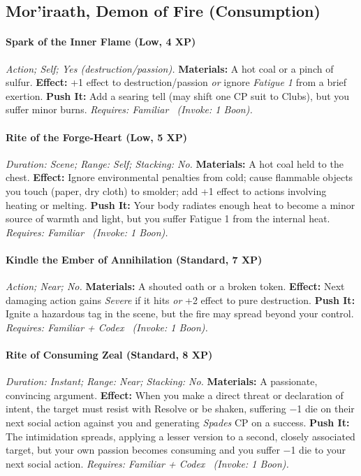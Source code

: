 \documentclass[12pt,twoside]{book}
\begin{document}
\subsection{Mor'iraath, Demon of Fire (Consumption)}
\paragraph{Spark of the Inner Flame (Low, 4 XP)} \emph{Action; Self; Yes (destruction/passion).}
\textbf{Materials:} A hot coal or a pinch of sulfur.
\textbf{Effect:} +1 effect to destruction/passion \emph{or} ignore \emph{Fatigue 1} from a brief exertion.
\textbf{Push It:} Add a searing tell (may shift one CP suit to Clubs), but you suffer minor burns.
\emph{Requires: Familiar \ (\textit{Invoke:} 1 Boon).}
\paragraph{Rite of the Forge-Heart (Low, 5 XP)} \emph{Duration: Scene; Range: Self; Stacking: No.}
\textbf{Materials:} A hot coal held to the chest.
\textbf{Effect:} Ignore environmental penalties from cold; cause flammable objects you touch (paper, dry cloth) to smolder; add +1 effect to actions involving heating or melting.
\textbf{Push It:} Your body radiates enough heat to become a minor source of warmth and light, but you suffer Fatigue 1 from the internal heat.
\emph{Requires: Familiar \ (\textit{Invoke:} 1 Boon).}
\paragraph{Kindle the Ember of Annihilation (Standard, 7 XP)} \emph{Action; Near; No.}
\textbf{Materials:} A shouted oath or a broken token.
\textbf{Effect:} Next damaging action gains \emph{Severe} if it hits \emph{or} +2 effect to pure destruction.
\textbf{Push It:} Ignite a hazardous tag in the scene, but the fire may spread beyond your control.
\emph{Requires: Familiar + Codex \ (\textit{Invoke:} 1 Boon).}
\paragraph{Rite of Consuming Zeal (Standard, 8 XP)} \emph{Duration: Instant; Range: Near; Stacking: No.}
\textbf{Materials:} A passionate, convincing argument.
\textbf{Effect:} When you make a direct threat or declaration of intent, the target must resist with Resolve or be shaken, suffering −1 die on their next social action against you and generating \emph{Spades} CP on a success.
\textbf{Push It:} The intimidation spreads, applying a lesser version to a second, closely associated target, but your own passion becomes consuming and you suffer −1 die to your next social action.
\emph{Requires: Familiar + Codex \ (\textit{Invoke:} 1 Boon).}
\end{document}
